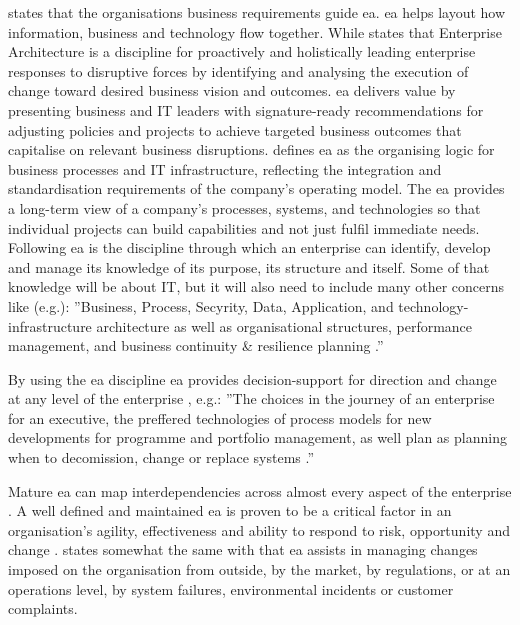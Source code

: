 \textcite{White2018} states that the organisations business requirements guide \acrshort{ea}. \acrshort{ea} helps layout how information, business and technology flow together. While \textcite{Gartner} states that Enterprise Architecture is a discipline for proactively and holistically leading enterprise responses to disruptive forces by identifying and analysing the execution of change toward desired business vision and outcomes. \acrshort{ea} delivers value by presenting business and IT leaders with signature-ready recommendations for adjusting policies and projects to achieve targeted business outcomes that capitalise on relevant business disruptions. \textcite[p. 9]{Ross2014} defines \acrshort{ea} as the organising logic for business processes and IT infrastructure, reflecting the integration and standardisation requirements of the company’s operating model. The \acrshort{ea} provides a long-term view of a company’s processes, systems, and technologies so that individual projects can build capabilities and not just fulfil immediate needs. Following \textcite[p. 4]{Graves2009} \acrfull{ea} is the discipline through which an enterprise can identify, develop and manage its knowledge of its purpose, its structure and itself. Some of that knowledge will be about IT, but it will also need to include many other concerns like (e.g.): ''Business, Process, Secyrity, Data, Application, and technology-infrastructure architecture as well as organisational structures, performance management, and  business continuity \& resilience planning \parencite[p. 4]{Graves2009}.''

By using the \acrshort{ea} discipline \acrshort{ea} provides decision-support for direction and change at any level of the enterprise \parencite[p. 4]{Graves2009}, e.g.: ''The choices in the journey of an enterprise for an executive, the preffered technologies of process models for new developments for programme and portfolio management, as well plan as planning when to decomission, change or replace systems \parencite[p. 4]{Graves2009}.''

Mature \acrshort{ea} can map interdependencies across almost every aspect of the enterprise \parencite[p. 5]{Graves2009}. A well defined and maintained \acrshort{ea} is proven to be a critical factor in an organisation's agility, effectiveness and ability to respond to risk, opportunity and change \parencite{Ross2014}.  \textcite[p. 5]{Graves2009} states somewhat the same with that \acrshort{ea} assists in managing changes imposed on the organisation from outside, by the market, by regulations, or at an operations level, by system failures, environmental incidents or customer complaints.

